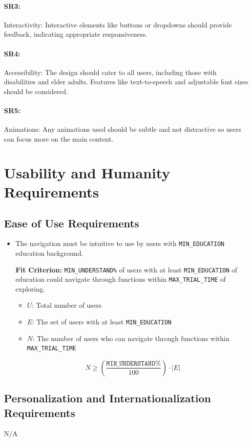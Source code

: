 \documentclass[12pt]{article}
\newcounter{uhrnum} %
\newcommand{\rtheuhrnum}{UHR\refstepcounter{uhrnum}\theuhrnum:}
\begin{document}
\paragraph{SR3:}Interactivity: Interactive elements like buttons or dropdowns should provide feedback, indicating appropriate responsiveness.
\paragraph{SR4:}Accessibility: The design should cater to all users, including those with disabilities and elder adults. Features like text-to-speech and adjustable font sizes should be considered.
\paragraph{SR5:}Animations: Any animations used should be subtle and not distractive so users can focus more on the main content. 



\section{Usability and Humanity Requirements}
\subsection{Ease of Use Requirements}
\begin{itemize}[leftmargin=16.5mm,labelsep=4mm,label=\rtheuhrnum]
\item The navigation must be intuitive to use by users with \texttt{MIN\_EDUCATION} education background.

\textbf{Fit Criterion:} \texttt{MIN\_UNDERSTAND\%} of users with at least \texttt{MIN\_EDUCATION} of education could navigate through functions within \texttt{MAX\_TRIAL\_TIME} of exploring.

\begin{itemize}
    \item \( U \): Total number of users
    \item \( E \): The set of users with at least \texttt{MIN\_EDUCATION}
    \item \( N \): The number of users who can navigate through functions within \texttt{MAX\_TRIAL\_TIME}
\end{itemize}
\[
    N \geq \left( \frac{\texttt{MIN\_UNDERSTAND\%}}{100} \right) \cdot |E|
\]
\end{itemize}
\subsection{Personalization and Internationalization Requirements}
N/A
\end{document}
